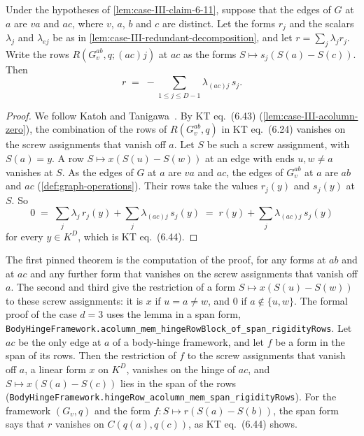 \begin{lemma}
  \label{lem:case-III-claim612-eq644}
  \leanok
  Under the hypotheses of \cref{lem:case-III-claim-6-11}, suppose that
  the edges of $G$ at $a$ are $va$ and $ac$, where $v$, $a$, $b$ and $c$
  are distinct. Let the forms $r_j$ and the scalars $\lambda_j$ and
  $\lambda_{ej}$ be as in \cref{lem:case-III-redundant-decomposition},
  and let $r = \sum_j \lambda_j r_j$. Write the rows
  $R(G_v^{ab}, q; (ac)j)$ at $ac$ as the forms
  $S \mapsto s_j(S(a) - S(c))$. Then
  \[
    r \;=\; -\sum_{1 \le j \le D-1} \lambda_{(ac)j}\, s_j .
  \]
\end{lemma}
\begin{proof}
  \leanok
  We follow Katoh and Tanigawa~\cite[pp.~690--691]{katohTanigawa2011}.
  By KT eq.~(6.43) (\cref{lem:case-III-acolumn-zero}), the combination
  of the rows of $R(G_v^{ab}, q)$ in KT eq.~(6.24) vanishes on the screw
  assignments that vanish off $a$. Let $S$ be such a screw assignment,
  with $S(a) = y$. A row $S \mapsto x(S(u) - S(w))$ at an edge with ends
  $u, w \neq a$ vanishes at $S$. As the edges of $G$ at $a$ are $va$ and
  $ac$, the edges of $G_v^{ab}$ at $a$ are $ab$ and $ac$
  (\cref{def:graph-operations}). Their rows take the values $r_j(y)$ and
  $s_j(y)$ at $S$. So
  \[
    0 \;=\; \sum_j \lambda_j\, r_j(y) + \sum_j \lambda_{(ac)j}\, s_j(y)
    \;=\; r(y) + \sum_j \lambda_{(ac)j}\, s_j(y)
  \]
  for every $y \in K^D$, which is KT eq.~(6.44).
\end{proof}

\begin{fmlnote}
  The first pinned theorem is the computation of the proof, for any forms
  at $ab$ and at $ac$ and any further form that vanishes on the screw
  assignments that vanish off $a$. The second and third give the
  restriction of a form $S \mapsto x(S(u) - S(w))$ to these screw
  assignments: it is $x$ if $u = a \neq w$, and $0$ if
  $a \notin \{u, w\}$. The formal proof of the case $d = 3$ uses the
  lemma in a span form,
  \texttt{BodyHingeFramework.\allowbreak{}acolumn\_\allowbreak{}mem\_\allowbreak{}hingeRowBlock\_\allowbreak{}of\_\allowbreak{}span\_\allowbreak{}rigidityRows}.
  Let $ac$ be the only edge at $a$ of a body-hinge framework, and let $f$
  be a form in the span of its rows. Then the restriction of $f$ to the
  screw assignments that vanish off $a$, a linear form $x$ on $K^D$,
  vanishes on the hinge of $ac$, and $S \mapsto x(S(a) - S(c))$ lies in
  the span of the rows
  (\texttt{BodyHingeFramework.\allowbreak{}hingeRow\_\allowbreak{}acolumn\_\allowbreak{}mem\_\allowbreak{}span\_\allowbreak{}rigidityRows}).
  For the framework $(G_v, q)$ and the form
  $f \colon S \mapsto r(S(a) - S(b))$, the span form says that $r$
  vanishes on $C(q(a), q(c))$, as KT eq.~(6.44) shows.
\end{fmlnote}

